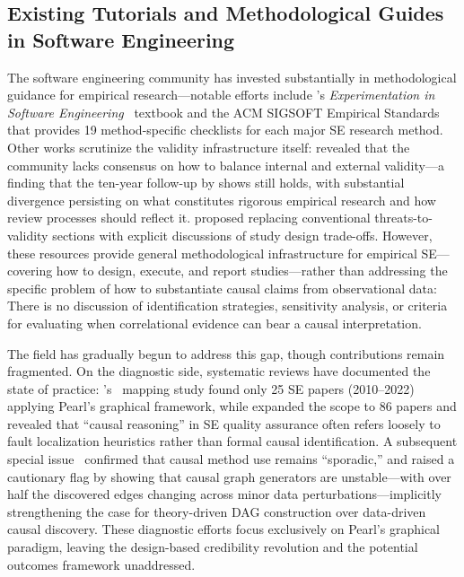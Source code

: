 \subsection{Existing Tutorials and Methodological Guides in Software Engineering}
\label{sec:bg-tutorials}

The software engineering community has invested substantially in methodological guidance for empirical research---notable efforts include \citeauthor{DBLP:books/sp/WohlinRHORW24}'s \emph{Experimentation in Software Engineering}~\cite{DBLP:books/sp/WohlinRHORW24} textbook and the ACM SIGSOFT Empirical Standards~\cite{DBLP:journals/corr/abs-2010-03525} that provides 19 method-specific checklists for each major SE research method.
Other works scrutinize the validity infrastructure itself: \citet{DBLP:conf/icse/SiegmundSA15} revealed that the community lacks consensus on how to balance internal and external validity---a finding that the ten-year follow-up by \citet{DBLP:conf/icse/MailachSAS26} shows still holds, with substantial divergence persisting on what constitutes rigorous empirical research and how review processes should reflect it.
\citet{DBLP:journals/tosem/RobillardAEGLNNSSS24} proposed replacing conventional threats-to-validity sections with explicit discussions of study design trade-offs.
However, these resources provide general methodological infrastructure for empirical SE---covering how to design, execute, and report studies---rather than addressing the specific problem of how to substantiate causal claims from observational data: There is no discussion of identification strategies, sensitivity analysis, or criteria for evaluating when correlational evidence can bear a causal interpretation.

The field has gradually begun to address this gap, though contributions remain fragmented.
On the diagnostic side, systematic reviews have documented the state of practice: \citeauthor{DBLP:journals/infsof/Siebert23}'s~\cite{DBLP:journals/infsof/Siebert23} mapping study found only 25 SE papers (2010--2022) applying Pearl's graphical framework, while \citet{DBLP:journals/infsof/GiamatteiGPR25} expanded the scope to 86 papers and revealed that ``causal reasoning'' in SE quality assurance often refers loosely to fault localization heuristics rather than formal causal identification.
A subsequent special issue~\cite{journals/infsof/SiebertTGWKS25} confirmed that causal method use remains ``sporadic,'' and \citet{journals/ese/HulseEM25} raised a cautionary flag by showing that causal graph generators are unstable---with over half the discovered edges changing across minor data perturbations---implicitly strengthening the case for theory-driven DAG construction over data-driven causal discovery.
These diagnostic efforts focus exclusively on Pearl's graphical paradigm, leaving the design-based credibility revolution and the potential outcomes framework unaddressed.

